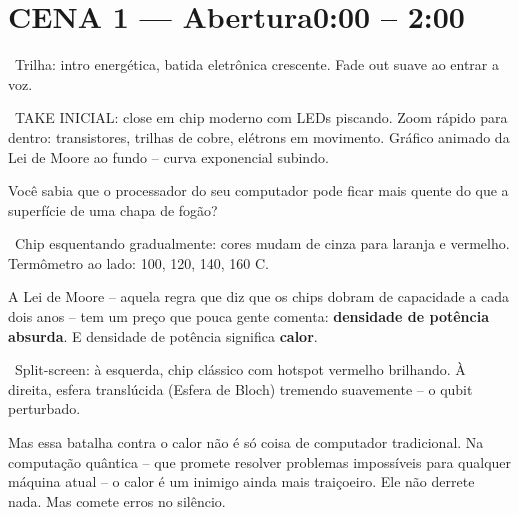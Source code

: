 \section{CENA 1 --- Abertura\hfill\normalfont\small\color{corTempo}0:00 -- 2:00}


\begin{audiocue}
\faMusic\ Trilha: intro energética, batida eletrônica crescente. Fade out suave ao entrar a voz.
\end{audiocue}

\begin{visual}
\faFilm\ TAKE INICIAL: close em chip moderno com LEDs piscando. Zoom rápido para dentro:
transistores, trilhas de cobre, elétrons em movimento. Gráfico animado da Lei de Moore
ao fundo -- curva exponencial subindo.
\end{visual}


\begin{fala}
Você sabia que o processador do seu computador pode ficar mais quente do que
a superfície de uma chapa de fogão?
\end{fala}

\begin{visual}
\faFilm\ Chip esquentando gradualmente: cores mudam de cinza para laranja e vermelho.
Termômetro ao lado: 100, 120, 140, 160 {\textdegree}C.
\end{visual}

\begin{fala}
A Lei de Moore -- aquela regra que diz que os chips dobram de capacidade a cada
dois anos -- tem um preço que pouca gente comenta: \textbf{densidade de potência
absurda}. E densidade de potência significa \textbf{calor}.
\end{fala}


\begin{visual}
\faFilm\ Split-screen: à esquerda, chip clássico com hotspot vermelho brilhando.
À direita, esfera translúcida (Esfera de Bloch) tremendo suavemente -- o qubit perturbado.
\end{visual}

\begin{fala}
Mas essa batalha contra o calor não é só coisa de computador tradicional.
Na computação quântica -- que promete resolver problemas impossíveis para qualquer
máquina atual -- o calor é um inimigo ainda mais traiçoeiro.
Ele não derrete nada. Mas comete erros no silêncio.
\end{fala}

